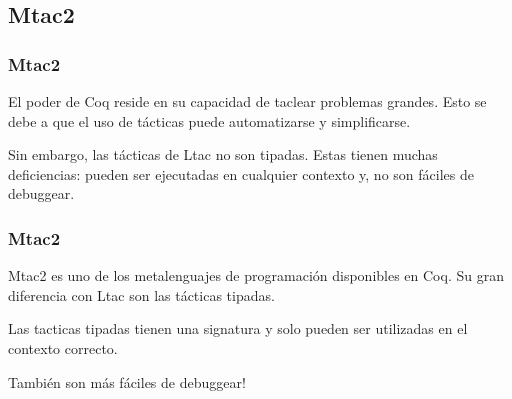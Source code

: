 \documentclass{beamer}
\begin{document}
\begin{frame}
\section{Mtac2}
\frametitle{Mtac2}

El poder de Coq reside en su capacidad de taclear problemas grandes.
Esto se debe a que el uso de tácticas puede automatizarse y simplificarse.
\vspace{\baselineskip}

Sin embargo, las tácticas de Ltac no son tipadas.
Estas tienen muchas deficiencias: pueden ser ejecutadas en cualquier contexto y, no son fáciles de debuggear.
\end{frame}

\begin{frame}
\frametitle{Mtac2}

Mtac2 es uno de los metalenguajes de programación disponibles en Coq.
Su gran diferencia con Ltac son las tácticas tipadas.
\vspace{\baselineskip}

Las tacticas tipadas tienen una signatura y solo pueden ser utilizadas en el contexto correcto.
\vspace{\baselineskip}

También son más fáciles de debuggear!
\end{frame}

\end{document}

